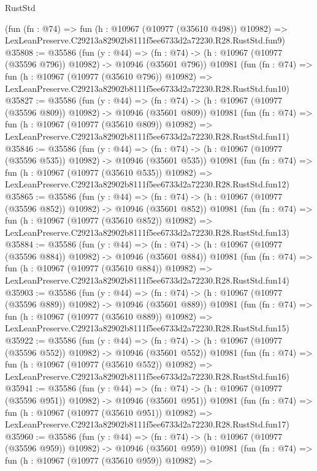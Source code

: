 \begin{lexlean}{RustStd}
\begin{coremodule}
    (fun (fn : @74) =>
    fun (h : @10967 (@10977 (@35610 @498)) @10982) =>
    LexLeanPreserve.C29213a82902b8111f5ee6733d2a72230.R28.RustStd.fun9)
@35808 := @35586
    (fun (y : @44) =>
    (fn : @74) -> (h : @10967 (@10977 (@35596 @796)) @10982) -> @10946 (@35601 @796))
    @10981
    (fun (fn : @74) =>
    fun (h : @10967 (@10977 (@35610 @796)) @10982) =>
    LexLeanPreserve.C29213a82902b8111f5ee6733d2a72230.R28.RustStd.fun10)
@35827 := @35586
    (fun (y : @44) =>
    (fn : @74) -> (h : @10967 (@10977 (@35596 @809)) @10982) -> @10946 (@35601 @809))
    @10981
    (fun (fn : @74) =>
    fun (h : @10967 (@10977 (@35610 @809)) @10982) =>
    LexLeanPreserve.C29213a82902b8111f5ee6733d2a72230.R28.RustStd.fun11)
@35846 := @35586
    (fun (y : @44) =>
    (fn : @74) -> (h : @10967 (@10977 (@35596 @535)) @10982) -> @10946 (@35601 @535))
    @10981
    (fun (fn : @74) =>
    fun (h : @10967 (@10977 (@35610 @535)) @10982) =>
    LexLeanPreserve.C29213a82902b8111f5ee6733d2a72230.R28.RustStd.fun12)
@35865 := @35586
    (fun (y : @44) =>
    (fn : @74) -> (h : @10967 (@10977 (@35596 @852)) @10982) -> @10946 (@35601 @852))
    @10981
    (fun (fn : @74) =>
    fun (h : @10967 (@10977 (@35610 @852)) @10982) =>
    LexLeanPreserve.C29213a82902b8111f5ee6733d2a72230.R28.RustStd.fun13)
@35884 := @35586
    (fun (y : @44) =>
    (fn : @74) -> (h : @10967 (@10977 (@35596 @884)) @10982) -> @10946 (@35601 @884))
    @10981
    (fun (fn : @74) =>
    fun (h : @10967 (@10977 (@35610 @884)) @10982) =>
    LexLeanPreserve.C29213a82902b8111f5ee6733d2a72230.R28.RustStd.fun14)
@35903 := @35586
    (fun (y : @44) =>
    (fn : @74) -> (h : @10967 (@10977 (@35596 @889)) @10982) -> @10946 (@35601 @889))
    @10981
    (fun (fn : @74) =>
    fun (h : @10967 (@10977 (@35610 @889)) @10982) =>
    LexLeanPreserve.C29213a82902b8111f5ee6733d2a72230.R28.RustStd.fun15)
@35922 := @35586
    (fun (y : @44) =>
    (fn : @74) -> (h : @10967 (@10977 (@35596 @552)) @10982) -> @10946 (@35601 @552))
    @10981
    (fun (fn : @74) =>
    fun (h : @10967 (@10977 (@35610 @552)) @10982) =>
    LexLeanPreserve.C29213a82902b8111f5ee6733d2a72230.R28.RustStd.fun16)
@35941 := @35586
    (fun (y : @44) =>
    (fn : @74) -> (h : @10967 (@10977 (@35596 @951)) @10982) -> @10946 (@35601 @951))
    @10981
    (fun (fn : @74) =>
    fun (h : @10967 (@10977 (@35610 @951)) @10982) =>
    LexLeanPreserve.C29213a82902b8111f5ee6733d2a72230.R28.RustStd.fun17)
@35960 := @35586
    (fun (y : @44) =>
    (fn : @74) -> (h : @10967 (@10977 (@35596 @959)) @10982) -> @10946 (@35601 @959))
    @10981
    (fun (fn : @74) =>
    fun (h : @10967 (@10977 (@35610 @959)) @10982) =>

\end{coremodule}
\end{lexlean}
